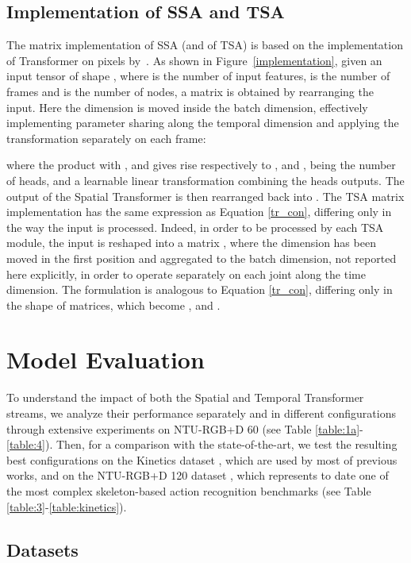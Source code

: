 \documentclass[review]{cvpr}
\begin{document}
\subsection{Implementation of SSA and TSA} \label{sec:implementation}

The matrix implementation of SSA (and of TSA) is based on the implementation of Transformer on pixels by~\cite{DBLP:journals/corr/abs-1904-09925}. As shown in Figure~\ref{implementation}, given an input tensor of shape , where  is the number of input features,  is the number of frames and  is the number of nodes, a matrix  is obtained by rearranging the input. Here the  dimension is moved inside the batch dimension, effectively implementing parameter sharing along the temporal dimension and applying the transformation separately on each frame:

where the product with ,  and  gives rise respectively to ,  and , being  the number of heads, and  a learnable linear transformation combining the heads outputs. 
The output of the Spatial Transformer is then rearranged back into . The TSA matrix implementation has the same expression as Equation \eqref{tr_con}, differing only in the way the input  is processed. Indeed, in order to be processed by each TSA module, the input is reshaped into a matrix , where the  dimension has been moved in the first position and aggregated to the batch dimension, not reported here explicitly, in order to operate separately on each joint along the time dimension. 
The formulation is analogous to Equation \eqref{tr_con}, differing only in the shape of matrices, which become ,  and .



\section{Model Evaluation}
To understand the impact of both the Spatial and Temporal Transformer streams, we analyze their performance separately and in different configurations through extensive experiments on NTU-RGB+D 60 \cite{ntu} (see Table \ref{table:1a}-\ref{table:4}). Then, for a comparison with the state-of-the-art, we test the resulting best configurations on the Kinetics dataset \cite{Kin}, which are used by most of previous works, and on the NTU-RGB+D 120 dataset \cite{ntu120}, which represents to date one of the most complex skeleton-based action recognition benchmarks (see Table \ref{table:3}-\ref{table:kinetics}).


\subsection{Datasets}
\end{document}
